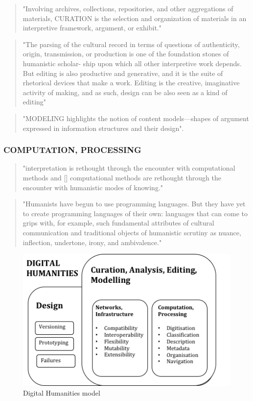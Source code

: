 \begin{quote}
"Involving archives, collections, repositories, and other aggregations of materials, CURATION is the selection and organization of materials in an interpretive framework, argument, or exhibit." \citep[p.17]{Burdick2012}
\end{quote}

\begin{quote}
"The parsing of the cultural record in terms of questions of authenticity, origin, transmission, or production is one of the foundation stones of humanistic scholar- ship upon which all other interpretive work depends. But editing is also productive and generative, and it is the suite of rhetorical devices that make a work. Editing is the creative, imaginative activity of making, and as such, design can be also seen as a kind of editing" \citep[p.18]{Burdick2012}
\end{quote}

\begin{quote}
"MODELING highlights the notion of content models—shapes of argument expressed in information structures and their design". \citep[p.18]{Burdick2012}
\end{quote}

\subsubsection{COMPUTATION, PROCESSING}
\begin{quote}
"interpretation is rethought through the encounter with computational methods and [] computational methods are rethought through the encounter with humanistic modes of knowing." \citep[p.103]{Burdick2012}
\end{quote}

\begin{quote}
"Humanists have begun to use programming languages. But they have yet to create programming languages of their own: languages that can come to grips with, for example, such fundamental attributes of cultural communication and traditional objects of humanistic scrutiny as nuance, inflection, undertone, irony, and ambivalence." \citep[p.103]{Burdick2012}
\end{quote}

\begin{figure}[htbp]
  \centering
    \includegraphics{images/dh.png}
  \caption[Digital Humanities]{Digital Humanities model}
  \label{fig:Digital_Humanities}
\end{figure}


